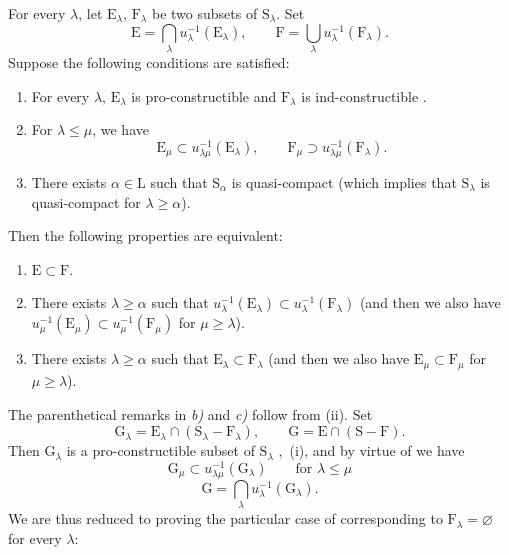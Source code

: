 \begin{theorem}[8.3.2]
\label{IV.8.3.2}
For every $\lambda$, let $\mathrm{E}_\lambda$, $\mathrm{F}_\lambda$ be two subsets of $\mathrm{S}_\lambda$.
Set
\begin{equation}
  \mathrm{E}=\bigcap_\lambda u_\lambda^{-1}(\mathrm{E}_\lambda),\qquad \mathrm{F}=\bigcup_\lambda u_\lambda^{-1}(\mathrm{F}_\lambda).
  \tag{8.3.2.1}
\label{IV.8.3.2.1}
\end{equation}
Suppose the following conditions are satisfied:
\begin{enumerate}[label=(\roman*)]
  \item For every $\lambda$, $\mathrm{E}_\lambda$ is pro-constructible and $\mathrm{F}_\lambda$ is ind-constructible .
  \item For $\lambda\leqslant\mu$, we have
  \[
    \mathrm{E}_\mu\subset u_{\lambda\mu}^{-1}(\mathrm{E}_\lambda),\qquad \mathrm{F}_\mu\supset u_{\lambda\mu}^{-1}(\mathrm{F}_\lambda).
  \]
  \item There exists $\alpha\in\mathrm{L}$ such that $\mathrm{S}_\alpha$ is quasi-compact (which implies that $\mathrm{S}_\lambda$ is quasi-compact for $\lambda\geqslant\alpha$).
\end{enumerate}
Then the following properties are equivalent:
\begin{enumerate}[label=\emph{\alph*)}]
  \item $\mathrm{E}\subset\mathrm{F}$.
  \item There exists $\lambda\geqslant\alpha$ such that $u_\lambda^{-1}(\mathrm{E}_\lambda)\subset u_\lambda^{-1}(\mathrm{F}_\lambda)$ (and then we also have $u_\mu^{-1}(\mathrm{E}_\mu)\subset u_\mu^{-1}(\mathrm{F}_\mu)$ for
$\mu\geqslant\lambda$).
  \item There exists $\lambda\geqslant\alpha$ such that $\mathrm{E}_\lambda\subset\mathrm{F}_\lambda$ (and then we also have $\mathrm{E}_\mu\subset\mathrm{F}_\mu$ for $\mu\geqslant\lambda$).
\end{enumerate}
The parenthetical remarks in \emph{b)} and \emph{c)} follow from (ii).
Set
\[
  \mathrm{G}_\lambda=\mathrm{E}_\lambda\cap(\mathrm{S}_\lambda-\mathrm{F}_\lambda),\qquad \mathrm{G}=\mathrm{E}\cap(\mathrm{S}-\mathrm{F}).
\]
Then $\mathrm{G}_\lambda$ is a pro-constructible subset of $\mathrm{S}_\lambda$ ,~(i), and by virtue of  we have
\[
  \mathrm{G}_\mu\subset u_{\lambda\mu}^{-1}(\mathrm{G}_\lambda)\qquad\text{for }\lambda\leqslant\mu
\]
\[
  \mathrm{G}=\bigcap_\lambda u_\lambda^{-1}(\mathrm{G}_\lambda).
\]
We are thus reduced to proving the particular case of  corresponding to $\mathrm{F}_\lambda=\varnothing$ for every $\lambda$:
\end{theorem}

